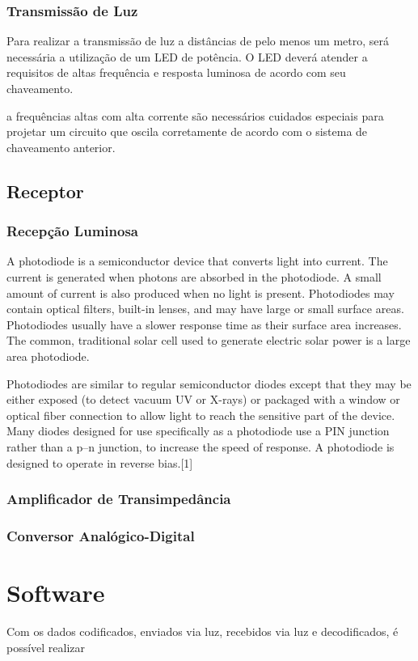 	\subsubsection{Transmissão de Luz}
		
		Para realizar a transmissão de luz a distâncias de pelo menos um metro, será necessária a utilização de um LED de potência. O LED deverá atender a requisitos de altas frequência e resposta luminosa de acordo com seu chaveamento.
		

		 a frequências altas com alta corrente são necessários cuidados especiais para projetar um circuito que oscila corretamente de acordo com o sistema de chaveamento anterior.
		
	\subsection{Receptor}
	\subsubsection{Recepção Luminosa}
		
		A photodiode is a semiconductor device that converts light into current. The current is generated when photons are absorbed in the photodiode. A small amount of current is also produced when no light is present. Photodiodes may contain optical filters, built-in lenses, and may have large or small surface areas. Photodiodes usually have a slower response time as their surface area increases. The common, traditional solar cell used to generate electric solar power is a large area photodiode.
		
		Photodiodes are similar to regular semiconductor diodes except that they may be either exposed (to detect vacuum UV or X-rays) or packaged with a window or optical fiber connection to allow light to reach the sensitive part of the device. Many diodes designed for use specifically as a photodiode use a PIN junction rather than a p–n junction, to increase the speed of response. A photodiode is designed to operate in reverse bias.[1]

		
		
	\subsubsection{Amplificador de Transimpedância}
	
	\subsubsection{Conversor Analógico-Digital}
	
	\section{Software}
		Com os dados codificados, enviados via luz, recebidos via luz e decodificados, é possível realizar 